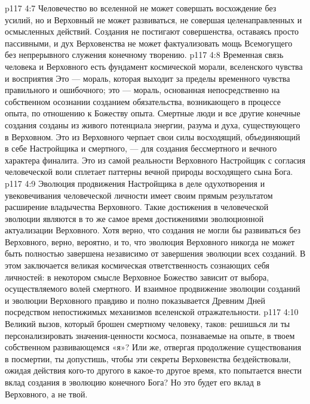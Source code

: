 \vs p117 4:7 \pc Человечество во вселенной не может совершать восхождение без усилий, но и Верховный не может развиваться, не совершая целенаправленных и осмысленных действий. Создания не постигают совершенства, оставаясь просто пассивными, и дух Верховенства не может фактуализовать мощь Всемогущего без непрерывного служения конечному творению.
\vs p117 4:8 Временная связь человека и Верховного есть фундамент космической морали, вселенского чувства и восприятия  Это --- мораль, которая выходит за пределы временного чувства правильного и ошибочного; это --- мораль, основанная непосредственно на собственном осознании созданием обязательства, возникающего в процессе опыта, по отношению к Божеству опыта. Смертные люди и все другие конечные создания созданы из живого потенциала энергии, разума и духа, существующего в Верховном. Это из Верховного черпает свои силы восходящий, объединяющий в себе Настройщика и смертного, --- для создания бессмертного и вечного характера финалита. Это из самой реальности Верховного Настройщик с согласия человеческой воли сплетает паттерны вечной природы восходящего сына Бога.
\vs p117 4:9 Эволюция продвижения Настройщика в деле одухотворения и увековечивания человеческой личности имеет своим прямым результатом расширение владычества Верховного. Такие достижения в человеческой эволюции являются в то же самое время достижениями эволюционной актуализации Верховного. Хотя верно, что создания не могли бы развиваться без Верховного, верно, вероятно, и то, что эволюция Верховного никогда не может быть полностью завершена независимо от завершения эволюции всех созданий. В этом заключается великая космическая ответственность сознающих себя личностей: в некотором смысле Верховное Божество зависит от выбора, осуществляемого волей смертного. И взаимное продвижение эволюции созданий и эволюции Верховного правдиво и полно показывается Древним Дней посредством непостижимых механизмов вселенской отражательности.
\vs p117 4:10 Великий вызов, который брошен смертному человеку, таков: решишься ли ты персонализировать значения\hyp{}ценности космоса, познаваемые на опыте, в твоем собственном развивающемся «я»? Или же, отвергая продолжение существования в посмертии, ты допустишь, чтобы эти секреты Верховенства бездействовали, ожидая действия кого\hyp{}то другого в какое\hyp{}то другое время, кто попытается  внести вклад создания в эволюцию конечного Бога? Но это будет его вклад в Верховного, а не твой.
